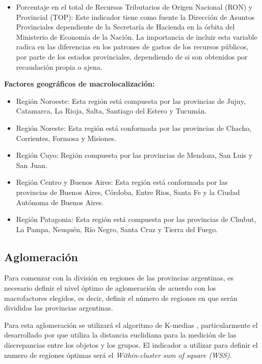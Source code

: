 \documentclass[12pt,a4paper]{article}
\begin{document}
\begin{itemize}
\item Porcentaje en el total de Recursos Tributarios de Origen Nacional (RON) y Provincial (TOP): Este indicador tiene como fuente la Dirección de Asuntos Provinciales dependiente de la Secretaría de Hacienda en la órbita del Ministerio de Economía de la Nación. La importancia de incluir esta variable radica en las diferencias en los patrones de gastos de los recursos públicos, por parte de los estados provinciales, dependiendo de si son obtenidos por recaudación propia o ajena.
\end{itemize}

\textbf{Factores geográficos de macrolocalización:}
\begin{itemize}
\item Región  Noroeste: Esta región está compuesta por las provincias de Jujuy, Catamarca, La Rioja, Salta, Santiago del Estero y Tucumán.
\item Región  Noreste: Esta región está conformada por las provincias de Chacho, Corrientes, Formosa y Misiones.
\item Región Cuyo: Región compuesta por las provincias de Mendoza, San Luis y San Juan.
\item Región Centro y Buenos Aires: Esta región está conformada por las provincias de Buenos Aires, Córdoba, Entre Rios, Santa Fe y la Ciudad Autónoma de Buenos Aires.
\item Región Patagonia: Esta región está compuesta por las provincias de Chubut, La Pampa, Neuquén, Río Negro, Santa Cruz y Tierra del Fuego.
\end{itemize}



\subsection{Aglomeración}

Para comenzar con la división en regiones de las provincias argentinas, es necesario definir el nivel óptimo de aglomeración de acuerdo con los macrofactores elegidos, es decir, definir el número de regiones en que serán divididas las provincias argentinas.

Para esta aglomeración se utilizará el algoritmo de K-medias \parencite{macqueen_methods_1967}, particularmente el desarrollado por \textcite{hartigan_k-means_1979} que utiliza la distancia euclidiana para la medición de las discrepancias entre los objetos y los grupos. El indicador a utilizar para definir el numero de regiones óptimas será el \textit{Within-cluster sum of square (WSS)}.
\end{document}
